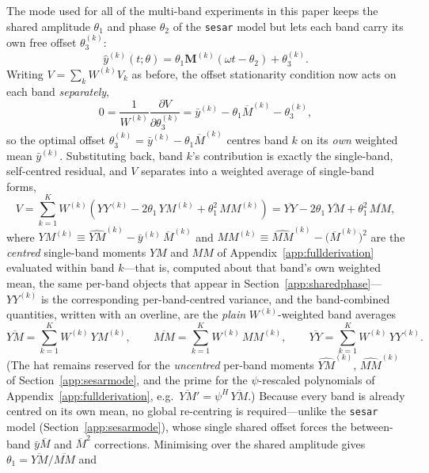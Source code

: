 \documentclass[apj]{emulateapj}
\newcommand{\bandavg}[1]{\overline{#1}}
\newcommand{\MMhat}{\widehat{MM}}
\newcommand{\YMhat}{\widehat{YM}}
\newcommand{\Mbar}{\overline{M}}
\newcommand{\ybar}{\bar{y}}
\newcommand{\Mbk}[1][k]{\Mbar^{(#1)}}
\newcommand{\Mt}{\mathbf{M}}
\newcommand{\YMh}[1][k]{\YMhat^{(#1)}}
\newcommand{\MMh}[1][k]{\MMhat^{(#1)}}
\newcommand{\yb}[1][k]{\ybar^{(#1)}}
\newcommand{\yhk}[1][k]{\hat{y}^{(#1)}}
\newcommand{\Mtk}[1][k]{\Mt^{(#1)}}
\newcommand{\Wtk}[1][k]{W^{(#1)}}
\newcommand{\eith}{\psi}
\begin{document}
\begin{appendix}
The mode used for all of the multi-band experiments in this paper keeps the shared amplitude $\theta_1$ and phase $\theta_2$ of the \texttt{sesar} model but lets each band carry its own free offset $\theta_3^{(k)}$:
\begin{equation}
\yhk(t;\theta) = \theta_1\Mtk(\omega t - \theta_2) + \theta_3^{(k)}.
\end{equation}
Writing $V = \sum_k \Wtk V_k$ as before, the offset stationarity condition now acts on each band \emph{separately},
\begin{equation}
0 = \frac{1}{\Wtk}\frac{\partial V}{\partial\theta_3^{(k)}} = \yb - \theta_1\Mbk - \theta_3^{(k)},
\end{equation}
so the optimal offset $\theta_3^{(k)} = \yb - \theta_1\Mbk$ centres band $k$ on its \emph{own} weighted mean $\yb$. Substituting back, band $k$'s contribution is exactly the single-band, self-centred residual, and $V$ separates into a weighted average of single-band forms,
\begin{equation}
V = \sum_{k=1}^K \Wtk\left(YY^{(k)} - 2\theta_1\,YM^{(k)} + \theta_1^2\,MM^{(k)}\right) = \bandavg{YY} - 2\theta_1\,\bandavg{YM} + \theta_1^2\,\bandavg{MM},
\end{equation}
where $YM^{(k)} \equiv \YMh - \yb\,\Mbk$ and $MM^{(k)} \equiv \MMh - \bigl(\Mbk\bigr)^2$ are the \emph{centred} single-band moments $YM$ and $MM$ of Appendix~\ref{app:fullderivation} evaluated within band $k$---that is, computed about that band's own weighted mean, the same per-band objects that appear in Section~\ref{app:sharedphase}---$YY^{(k)}$ is the corresponding per-band-centred variance, and the band-combined quantities, written with an overline, are the \emph{plain} $\Wtk$-weighted band averages
\begin{equation}
\label{eq:foaverage}
\bandavg{YM} = \sum_{k=1}^K \Wtk\,YM^{(k)}, \qquad \bandavg{MM} = \sum_{k=1}^K \Wtk\,MM^{(k)}, \qquad \bandavg{YY} = \sum_{k=1}^K \Wtk\,YY^{(k)}.
\end{equation}
(The hat remains reserved for the \emph{uncentred} per-band moments $\YMh$, $\MMh$ of Section~\ref{app:sesarmode}, and the prime for the $\eith$-rescaled polynomials of Appendix~\ref{app:fullderivation}, e.g.\ $\bandavg{YM}{}' = \eith^{H}\,\bandavg{YM}$.) Because every band is already centred on its own mean, no global re-centring is required---unlike the \texttt{sesar} model (Section~\ref{app:sesarmode}), whose single shared offset forces the between-band $\bar{y}\Mbar$ and $\Mbar^2$ corrections. Minimising over the shared amplitude gives $\theta_1 = \bandavg{YM}/\bandavg{MM}$ and

\end{appendix}
\end{document}
